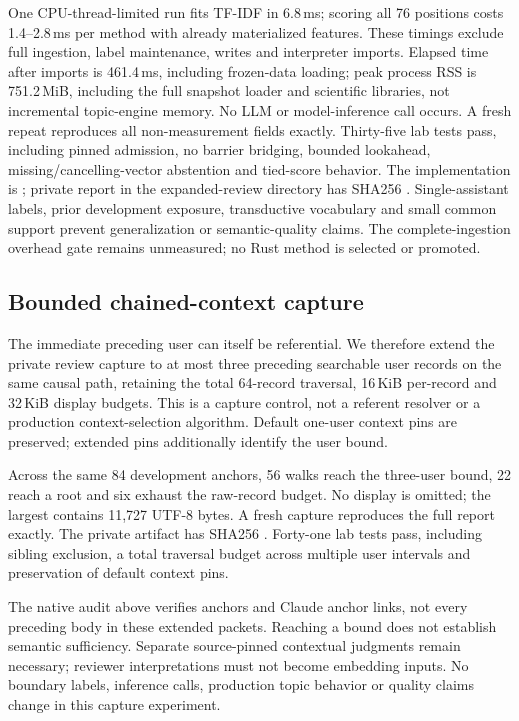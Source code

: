 \documentclass[11pt]{article}
\begin{document}
One CPU-thread-limited run fits TF-IDF in 6.8\,ms; scoring all 76 positions costs
1.4--2.8\,ms per method with already materialized features. These timings exclude
full ingestion, label maintenance, writes and interpreter imports. Elapsed time
after imports is 461.4\,ms, including frozen-data loading; peak process RSS is
751.2\,MiB, including the full snapshot loader and scientific libraries, not
incremental topic-engine memory. No LLM or model-inference call occurs.
A fresh repeat reproduces all non-measurement fields exactly. Thirty-five lab
tests pass, including pinned admission, no barrier bridging, bounded lookahead,
missing/cancelling-vector abstention and tied-score behavior. The implementation
is ; private report
 in the expanded-review directory has SHA256
.
Single-assistant labels, prior development exposure, transductive vocabulary and
small common support prevent generalization or semantic-quality claims.
The complete-ingestion overhead gate remains unmeasured; no Rust method is
selected or promoted.

\subsection{Bounded chained-context capture}
The immediate preceding user can itself be referential. We therefore extend the
private review capture to at most three preceding searchable user records on the
same causal path, retaining the total 64-record traversal, 16\,KiB per-record and
32\,KiB display budgets. This is a capture control, not a referent resolver or a
production context-selection algorithm. Default one-user context pins are
preserved; extended pins additionally identify the user bound.

Across the same 84 development anchors, 56 walks reach the three-user bound,
22 reach a root and six exhaust the raw-record budget. No display is omitted;
the largest contains 11,727 UTF-8 bytes. A fresh capture reproduces the full
report exactly. The private artifact  has SHA256
.
Forty-one lab tests pass, including sibling exclusion, a total traversal budget
across multiple user intervals and preservation of default context pins.

The native audit above verifies anchors and Claude anchor links, not every
preceding body in these extended packets. Reaching a bound does not establish
semantic sufficiency. Separate source-pinned contextual judgments remain
necessary; reviewer interpretations must not become embedding inputs. No
boundary labels, inference calls, production topic behavior or quality claims
change in this capture experiment.
\end{document}
